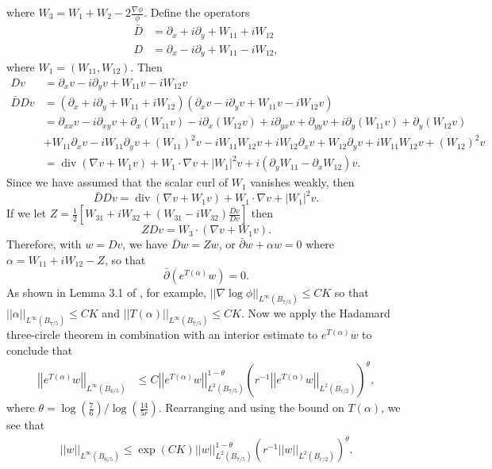 \documentclass[12pt,reqno]{amsart}
\theoremstyle{plain}
\theoremstyle{definition}
\DeclareMathOperator{\di}{div}
\newcommand{\al}{\alpha}
\newcommand{\te}{\theta}
\newcommand{\iny}{\infty}
\newcommand{\del}{ \partial}
\newcommand{\gr}{\nabla}
\newcommand{\norm}[1]{\left\vert \left\vert #1\right\vert\right\vert}
\newcommand{\abs}[1]{\left\vert#1\right\vert}
\newcommand{\brac}[1]{\left[#1\right]}
\newcommand{\pr}[1]{\left( #1 \right) }
\begin{document}
where $W_3 = W_1 + W_2 - 2 \frac{\gr \phi}{\phi}$.
Define the operators
\begin{align*}
\bar D &= \del_x + i \del_y + W_{11} + i W_{12} \\
D &= \del_x - i \del_y + W_{11} - i W_{12},
\end{align*}
where $W_1 = \pr{W_{11}, W_{12}}$.
Then
\begin{align*}
Dv &= \del_x v - i \del_y v + W_{11} v - i W_{12} v \\
\bar D D v 
&= \pr{\del_x + i \del_y + W_{11} + i W_{12} } \pr{\del_x v - i \del_y v + W_{11} v - i W_{12} v} \\
&= \del_{xx} v - i \del_{xy} v + \del_x\pr{W_{11} v} - i \del_x\pr{W_{12} v} 
+i \del_{yx} v + \del_{yy} v + i\del_y\pr{ W_{11} v} + \del_y\pr{ W_{12} v} \\
&+ W_{11} \del_x v - i W_{11} \del_y v + \pr{W_{11}}^2 v - i W_{11} W_{12} v 
+ i W_{12}\del_x v + W_{12} \del_y v +i  W_{11}W_{12} v + \pr{W_{12}}^2 v \\
&= \di\pr{\gr v + W_1 v} + W_1 \cdot \gr v + \abs{W_1}^2 v 
+ i\pr{\del_y W_{11} - \del_x W_{12}} v.
\end{align*}
Since we have assumed that the scalar curl of $W_1$ vanishes weakly, then 
$$\bar D D v = \di\pr{\gr v + W_1 v} + W_1 \cdot \gr v + \abs{W_1}^2 v .$$
If we let $Z = \frac 1 2 \brac{W_{31} + i W_{32} + \pr{W_{31} - i W_{32}}\frac{\overline{Dv}}{Dv}}$ then
$$Z Dv = W_3 \cdot \pr{\gr v + W_1 v}.$$
Therefore, with $w = Dv$, we have $\bar D w = Z w$, or $\bar \del w + \al w = 0$ where $\al = W_{11} + i W_{12} - Z$, so that
$$\bar \del \pr{e^{T\pr{\al}}w} = 0.$$
As shown in Lemma 3.1 of \cite{KSW15}, for example, $\norm{\gr \log \phi}_{L^\iny\pr{B_{7/5}}} \le C K$ so that  $\norm{\al}_{L^\iny\pr{B_{7/5}}} \le C K$ and $\norm{T\pr{\al}}_{L^\iny\pr{B_{7/5}}} \le C K$.
Now we apply the Hadamard three-circle theorem in combination with an interior estimate to $e^{T\pr{\al}}w$ to conclude that
\begin{align*}
\norm{e^{T\pr{\al}}w}_{L^\iny\pr{B_{6/5}}} 
&\le C \norm{e^{T\pr{\al}}w}_{L^2\pr{B_{7/5}}}^{1 - \te} \pr{ r^{-1}\norm{e^{T\pr{\al}}w}_{L^2\pr{B_{r/2}}}}^\te ,
\end{align*}
where $\te = \log\pr{\frac 7 6}/{\log\pr{\frac{14}{5r}}}$.
Rearranging and using the bound on $T\pr{\al}$, we see that
\begin{align*}
\norm{w}_{L^\iny\pr{B_{6/5}}} 
\le \exp\pr{C K} \norm{w}_{L^2\pr{B_{7/5}}}^{1 - \te} \pr{r^{-1}\norm{w}_{L^2\pr{B_{r/2}}}}^\te .
\end{align*}
\end{document}
